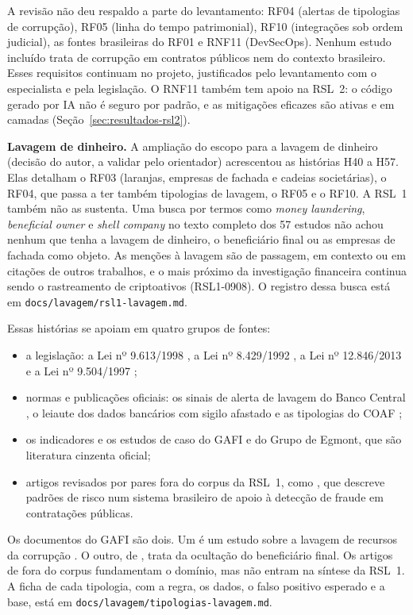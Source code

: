 A revisão não deu respaldo a parte do levantamento: RF04 (alertas de
tipologias de corrupção), RF05 (linha do tempo patrimonial), RF10
(integrações sob ordem judicial), as fontes brasileiras do RF01 e RNF11
(DevSecOps). Nenhum estudo incluído trata de corrupção em contratos
públicos nem do contexto brasileiro. Esses requisitos continuam no projeto,
justificados pelo levantamento com o especialista e pela legislação. O
RNF11 também tem apoio na RSL~2: o código gerado por IA não é seguro por
padrão, e as mitigações eficazes são ativas e em camadas
(Seção~\ref{sec:resultados-rsl2}).

\textbf{Lavagem de dinheiro.} A ampliação do escopo para a lavagem de
dinheiro (decisão do autor, a validar pelo orientador) acrescentou as
histórias H40 a H57. Elas detalham o RF03 (laranjas, empresas de fachada e
cadeias societárias), o RF04, que passa a ter também tipologias de lavagem,
o RF05 e o RF10. A RSL~1 também não as sustenta. Uma busca por termos como
\textit{money laundering}, \textit{beneficial owner} e \textit{shell
company} no texto completo dos 57 estudos não achou nenhum que tenha a
lavagem de dinheiro, o beneficiário final ou as empresas de fachada como
objeto. As menções à lavagem são de passagem, em contexto ou em citações de
outros trabalhos, e o mais próximo da investigação financeira continua sendo
o rastreamento de criptoativos (RSL1-0908). O registro dessa busca está em
\texttt{docs/lavagem/rsl1-lavagem.md}.

Essas histórias se apoiam em quatro grupos de fontes:
\begin{itemize}
	\item a legislação: a Lei nº 9.613/1998 \cite{brasil1998lei9613}, a Lei
	nº 8.429/1992 \cite{brasil1992lei8429}, a Lei nº 12.846/2013
	\cite{brasil2013lei12846} e a Lei nº 9.504/1997 \cite{brasil1997lei9504};
	\item normas e publicações oficiais: os sinais de alerta de lavagem do
	Banco Central \cite{bcb2020cc4001}, o leiaute dos dados bancários com
	sigilo afastado \cite{bcb2025in636} e as tipologias do COAF
	\cite{coaf2021casos};
	\item os indicadores e os estudos de caso do GAFI e do Grupo de Egmont,
	que são literatura cinzenta oficial;
	\item artigos revisados por pares fora do corpus da RSL~1, como
	, que descreve padrões de risco num sistema
	brasileiro de apoio à detecção de fraude em contratações públicas.
\end{itemize}
Os documentos do GAFI são dois. Um é um estudo sobre a lavagem de recursos
da corrupção \cite{fatf2011corruption}. O outro, de , trata
da ocultação do beneficiário final. Os artigos de fora do
corpus fundamentam o domínio, mas não entram na
síntese da RSL~1. A ficha de cada tipologia, com a regra, os dados, o falso
positivo esperado e a base, está em \texttt{docs/lavagem/tipologias-lavagem.md}.

